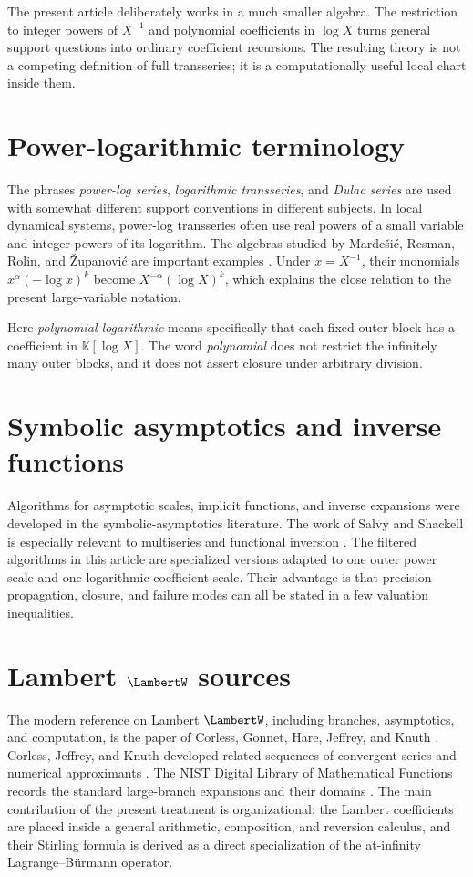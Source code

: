\documentclass[11pt,oneside,openany]{book}
\newcommand{\K}{\mathbb{K}}
\begin{document}
The present article deliberately works in a much smaller algebra.  The
restriction to integer powers of \(X^{-1}\) and polynomial coefficients in
\(\log X\) turns general support questions into ordinary coefficient
recursions.  The resulting theory is not a competing definition of full
transseries; it is a computationally useful local chart inside them.

\section{Power-logarithmic terminology}
The phrases \emph{power-log series}, \emph{logarithmic transseries}, and
\emph{Dulac series} are used with somewhat different support conventions in
different subjects.  In local dynamical systems, power-log transseries often
use real powers of a small variable and integer powers of its logarithm.  The
algebras studied by Marde\v{s}i\'c, Resman, Rolin, and
\v{Z}upanovi\'c are important examples \cite{MardesicEtAl2016}.  Under
\(x=X^{-1}\), their monomials \(x^\alpha(-\log x)^k\) become
\(X^{-\alpha}(\log X)^k\), which explains the close relation to the present
large-variable notation.

Here \emph{polynomial-logarithmic} means specifically that each fixed outer
block has a coefficient in \(\K[\log X]\).  The word \emph{polynomial} does
not restrict the infinitely many outer blocks, and it does not assert closure
under arbitrary division.

\section{Symbolic asymptotics and inverse functions}
Algorithms for asymptotic scales, implicit functions, and inverse expansions
were developed in the symbolic-asymptotics literature.  The work of Salvy and
Shackell is especially relevant to multiseries and functional inversion
\cite{SalvyShackell1992,SalvyShackell1998,SalvyShackell1999}.  The filtered
algorithms in this article are specialized versions adapted to one outer power
scale and one logarithmic coefficient scale.  Their advantage is that
precision propagation, closure, and failure modes can all be stated in a few
valuation inequalities.

\section{Lambert \texorpdfstring{\(\LambertW\)}{W} sources}
The modern reference on Lambert \(\LambertW\), including branches, asymptotics, and
computation, is the paper of Corless, Gonnet, Hare, Jeffrey, and Knuth
\cite{Corless1996}.  Corless, Jeffrey, and Knuth developed related sequences
of convergent series and numerical approximants \cite{JeffreyCorlessKnuth1997}.
The NIST Digital Library of Mathematical Functions records the standard
large-branch expansions and their domains \cite{DLMF}.  The main contribution
of the present treatment is organizational: the Lambert coefficients are
placed inside a general arithmetic, composition, and reversion calculus, and
their Stirling formula is derived as a direct specialization of the
at-infinity Lagrange--B\"urmann operator.
\end{document}
